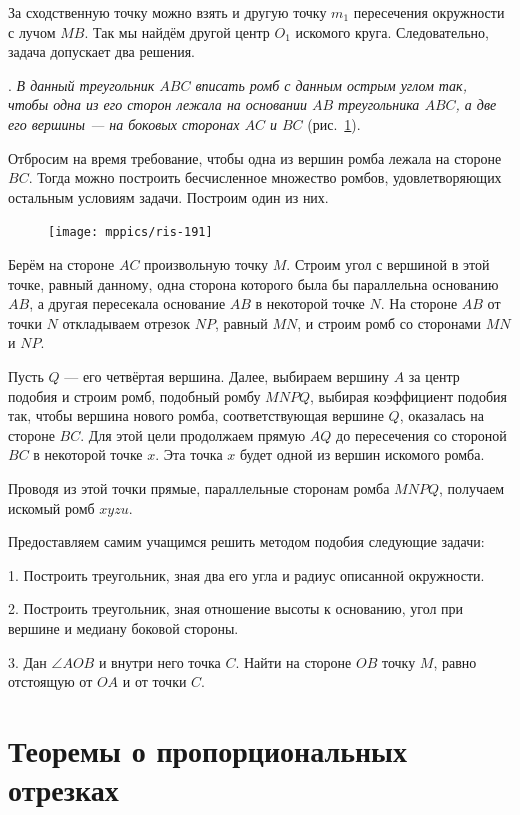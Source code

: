 \documentclass[oneside]{book}
\begin{document}
За сходственную точку можно взять и другую точку $m_1$ пересечения окружности с лучом $MB$.
Так мы найдём другой центр $O_1$ искомого круга.
Следовательно, задача допускает два решения.

\medskip

.
\emph{В данный треугольник $ABC$ вписать ромб с данным острым углом так, чтобы одна из его сторон лежала на основании $AB$ треугольника $ABC$, а две его вершины — на боковых сторонах $AC$ и $BC$} (рис.~\ref{1938/ris-191}).

Отбросим на время требование, чтобы одна из вершин ромба лежала на стороне $BC$.
Тогда можно построить бесчисленное множество ромбов, удовлетворяющих остальным условиям задачи.
Построим один из них.

\begin{figure}
\centering
\texttt{[image: mppics/ris-191]}
\caption{}\label{1938/ris-191}
\end{figure}

Берём на стороне $AC$ произвольную точку $M$.
Строим угол с вершиной в этой точке, равный данному, одна сторона которого была бы параллельна основанию $AB$, а другая пересекала основание $AB$ в некоторой точке $N$.
На стороне $AB$ от точки $N$ откладываем отрезок $NP$, равный $MN$, и строим ромб со сторонами $MN$ и $NP$.

Пусть $Q$ — его четвёртая вершина.
Далее, выбираем вершину $A$ за центр подобия и строим ромб, подобный ромбу $MNPQ$, выбирая коэффициент подобия так, чтобы вершина нового ромба, соответствующая вершине $Q$, оказалась на стороне $BC$.
Для этой цели продолжаем прямую $AQ$ до пересечения со стороной $BC$ в некоторой точке $x$.
Эта точка $x$ будет одной из вершин искомого ромба.

Проводя из этой точки прямые, параллельные сторонам ромба $MNPQ$, получаем искомый ромб $xyzu$.

Предоставляем самим учащимся решить методом подобия следующие задачи:

1.
Построить треугольник, зная два его угла и радиус описанной окружности.

2.
Построить треугольник, зная отношение высоты к основанию, угол при вершине и медиану боковой стороны.

3.
Дан $\angle AOB$ и внутри него точка $C$.
Найти на стороне $OB$ точку $M$, равно отстоящую от $OA$ и от точки $C$.

\section{Теоремы о пропорциональных отрезках} 
\end{document}
